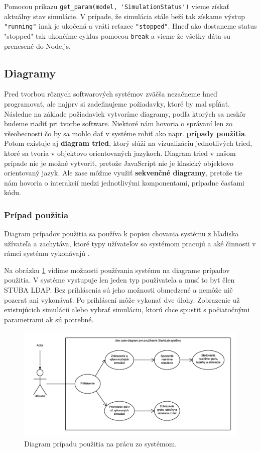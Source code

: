 Pomocou príkazu \verb|get_param(model, 'SimulationStatus')| vieme získať aktuálny stav simulácie. V prípade, že simulácia stále beží tak získame výstup \verb|"running"| inak je ukočená a vráti reťazec \verb|"stopped"|. Hneď ako dostaneme status "stopped" tak ukončíme cyklus pomocou \verb|break| a vieme že všetky dáta su prenesené do Node.js.

\subsection{Diagramy}
Pred tvorbou rôznych softwarových systémov zväčša nezačneme hneď programovať, ale najprv si zadefinujeme požiadavky, ktoré by mal spĺňať. Následne na základe požiadaviek vytvoríme diagramy, podľa ktorých sa neskôr budeme riadiť pri tvorbe software. Niektoré nám hovoria o správaní len zo všeobecnosti čo by sa mohlo dať v systéme robiť ako napr. \textbf{prípady použitia}. Potom existuje aj \textbf{diagram tried}, ktorý slúži na vizualizáciu jednotlivých tried, ktoré sa tvoria v objektovo orientovaných jazykoch. Diagram tried v našom prípade nie je možné vytvoriť, pretože JavaScript nie je klasický objektovo orientovaný jazyk. Ale zase môžme využiť \textbf{sekvenčné diagramy}, pretože tie nám hovoria o interakcií medzi jednotlivými komponentami, prípadne časťami kódu.

\subsubsection{Prípad použitia}
Diagram prípadov použitia sa používa k popisu chovania systému z hľadiska užívateľa a zachytáva, ktoré typy užívateľov so systémom pracujú a aké činnosti v rámci systému vykonávajú \cite{uml-usecase}.

Na obrázku \ref{img-use-case} vidíme možnosti používania systému na diagrame prípadov použitia. V systéme vystupuje len jeden typ používateľa a musí to byť člen STUBA LDAP. Bez prihlásenia sú jeho možnosti obmedzené a nemôže nič pozerať ani vykonávať. Po prihlásení môže vykonať dve úlohy. Zobrazenie už existujúcich simulácií alebo vybrať simuláciu, ktorú chce spustiť s počiatočnými parametrami ak sú potrebné.

\begin{figure}[H]
  \centering
  \includegraphics[scale=0.7]{img/diagrams/use-case.png}
  \caption{Diagram prípadu použitia na prácu zo systémom.}
  \label{img-use-case}
\end{figure}

